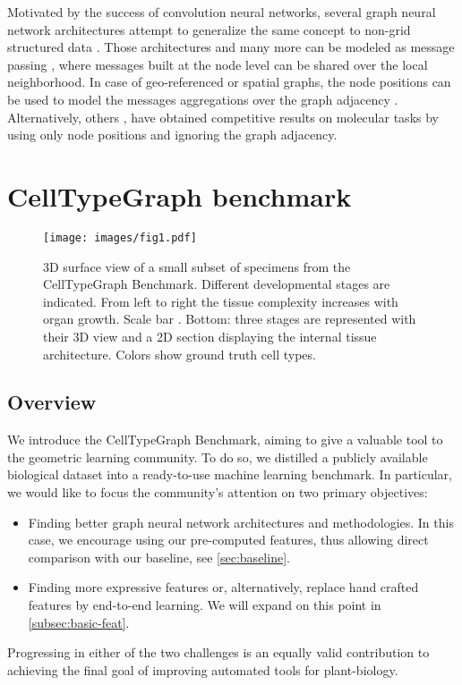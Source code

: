 \documentclass[10pt,twocolumn,letterpaper]{article}
\begin{document}
Motivated by the success of convolution neural networks, several graph neural network architectures attempt to generalize the same concept to non-grid structured data \cite{kipf2016semi, defferrard2016convolutional, he2021bernnet}. Those architectures and many more \cite{velickovic2018graph, hamilton2017inductive, xu2018powerful, pmlr-v97-wu19e, chen2020simple, li2019deepgcns, li2020deepergcn, brody2021attentive} can be modeled as message passing \cite{gilmer2017neural}, where messages built at the node level can be shared over the local neighborhood.
In case of geo-referenced or spatial graphs, the node positions can be used to model the messages aggregations over the graph adjacency \cite{danel2020spatial, de2020gauge}. Alternatively, others \cite{schutt2017schnet, unke2019physnet}, have obtained competitive results on molecular tasks by using only node positions and ignoring the graph adjacency.


\section{CellTypeGraph benchmark}

\begin{figure*}
  \centering
  \texttt{[image: images/fig1.pdf]}
  \caption{3D surface view of a small subset of specimens from the CellTypeGraph Benchmark. Different developmental stages are indicated. From left to right the tissue complexity increases with organ growth. Scale bar .
 Bottom: three stages are represented with their 3D view and a 2D section displaying the internal tissue architecture. Colors show ground truth cell types.}
  \label{fig:main}
\end{figure*}

\subsection{Overview}
We introduce the CellTypeGraph Benchmark, aiming to give a valuable tool to the geometric learning community. To do so, we distilled a publicly available biological dataset \cite{vijayan2021digital} into a ready-to-use machine learning benchmark.
In particular, we would like to focus the community's attention on two primary objectives:
\begin{itemize}
    \item Finding better graph neural network architectures and methodologies. In this case, we encourage using our pre-computed features, thus allowing direct comparison with our baseline, see \cref{sec:baseline}.
    \item Finding more expressive features or, alternatively, replace hand crafted features by end-to-end learning. We will expand on this point in \cref{subsec:basic-feat}.
\end{itemize} 
Progressing in either of the two challenges is an equally valid contribution to achieving the final goal of improving automated tools for plant-biology.
\end{document}
